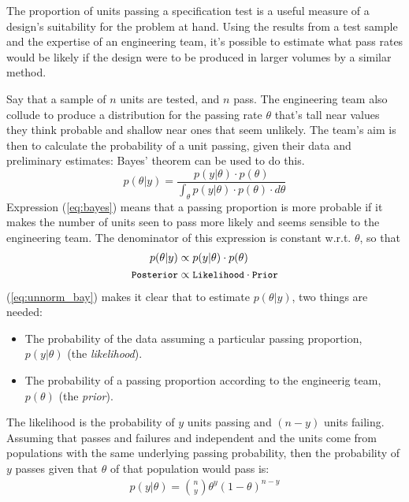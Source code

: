 \documentclass[11pt,a4paper,article]{memoir} %
\begin{document}
\par
The proportion of units passing a specification test is a useful measure of a design's suitability for the problem at hand. Using the results from a test sample and the expertise of an engineering team, it's possible to estimate what pass rates would be likely if the design were to be produced in larger volumes by a similar method.
\par
Say that a sample of $n$ units are tested, and $n$ pass. The engineering team also collude to produce a distribution for the passing rate $\theta$ that's tall near values they think probable and shallow near ones that seem unlikely. The team's aim is then to calculate the probability of a unit passing, given their data and preliminary estimates: Bayes' theorem can be used to do this.
\begin{equation}
  p(\theta|y) = \frac{p(y|\theta)\cdot p(\theta)}{\int_{\theta}p(y|\theta)\cdot p(\theta)\cdot d\theta}
  \label{eq:bayes}
\end{equation}
Expression (\ref{eq:bayes}) means that a passing proportion is more probable if it makes the number of units seen to pass more likely and seems sensible to the engineering team. The denominator of this expression is constant w.r.t. $\theta$, so that
\begin{align}
  p(\theta|y) &\propto p(y | \theta)\cdot p(\theta)   \label{eq:unnorm_bay} \\
  \small{\texttt{Posterior}} &\propto\small{{\texttt{Likelihood} \cdot \texttt{Prior}}} \nonumber
\end{align}
(\ref{eq:unnorm_bay}) makes it clear that to estimate $p(\theta|y)$, two things are needed:
\begin{itemize}
\item The probability of the data assuming a particular passing proportion, $p(y|\theta)$ (the \emph{likelihood}).
\item  The probability of a passing proportion according to the engineerig team, $p(\theta)$ (the \emph{prior}).
\end{itemize}
The likelihood is the probability of $y$ units passing and $(n-y)$ units failing. Assuming that passes and failures and independent and the units come from populations with the same underlying passing probability, then the probability of $y$ passes given that $\theta$ of that population would pass is:
\begin{gather}
  p(y|\theta) = \binom{n}{y} \theta^y (1 - \theta)^{n - y}
  \label{eq:binom_likelihood}
\end{gather}
\end{document}
